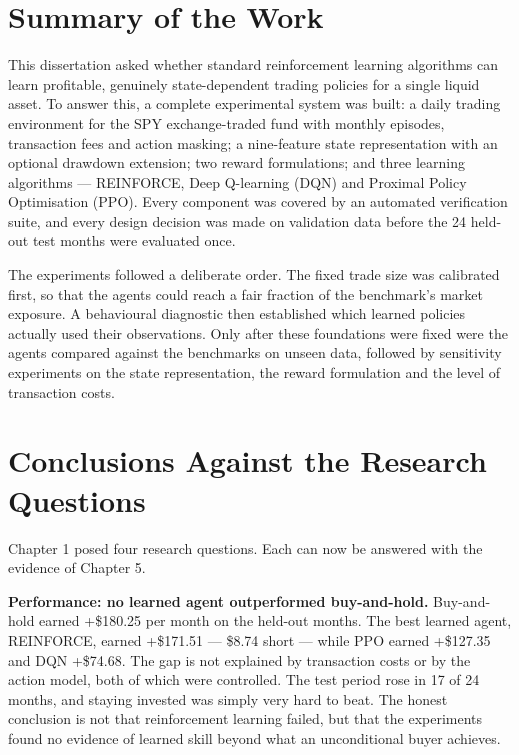 
\section{Summary of the Work}

This dissertation asked whether standard reinforcement learning algorithms
can learn profitable, genuinely state-dependent trading policies for a
single liquid asset. To answer this, a complete experimental system was
built: a daily trading environment for the SPY exchange-traded fund with
monthly episodes, transaction fees and action masking; a nine-feature state
representation with an optional drawdown extension; two reward
formulations; and three learning algorithms --- REINFORCE, Deep Q-learning
(DQN) and Proximal Policy Optimisation (PPO). Every component was covered
by an automated verification suite, and every design decision was made on
validation data before the 24 held-out test months were evaluated once.

The experiments followed a deliberate order. The fixed trade size was
calibrated first, so that the agents could reach a fair fraction of the
benchmark's market exposure. A behavioural diagnostic then established
which learned policies actually used their observations. Only after these
foundations were fixed were the agents compared against the benchmarks on
unseen data, followed by sensitivity experiments on the state
representation, the reward formulation and the level of transaction costs.

\section{Conclusions Against the Research Questions}

Chapter 1 posed four research questions. Each can now be answered with the
evidence of Chapter 5.

\textbf{Performance: no learned agent outperformed buy-and-hold.}
Buy-and-hold earned +\$180.25 per month on the held-out months. The best
learned agent, REINFORCE, earned +\$171.51 --- \$8.74 short --- while PPO
earned +\$127.35 and DQN +\$74.68. The gap is not explained by transaction
costs or by the action model, both of which were controlled. The test
period rose in 17 of 24 months, and staying invested was simply very hard
to beat. The honest conclusion is not that reinforcement learning failed,
but that the experiments found no evidence of learned skill beyond what an
unconditional buyer achieves.

